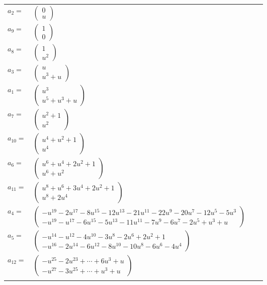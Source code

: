 \documentclass[1p]{elsarticle_modified}
\theoremstyle{definition}
\begin{document}
\begin{tabular}{m{7pt} m{180pt} m{7pt} m{180pt} }
\flushright $a_{2}=$&$\begin{pmatrix}0\\u\end{pmatrix}$ \\
\flushright $a_{9}=$&$\begin{pmatrix}1\\0\end{pmatrix}$ \\
\flushright $a_{8}=$&$\begin{pmatrix}1\\u^2\end{pmatrix}$ \\
\flushright $a_{3}=$&$\begin{pmatrix}u\\u^3+u\end{pmatrix}$ \\
\flushright $a_{1}=$&$\begin{pmatrix}u^3\\u^5+u^3+u\end{pmatrix}$ \\
\flushright $a_{7}=$&$\begin{pmatrix}u^2+1\\u^2\end{pmatrix}$ \\
\flushright $a_{10}=$&$\begin{pmatrix}u^4+u^2+1\\u^4\end{pmatrix}$ \\
\flushright $a_{6}=$&$\begin{pmatrix}u^6+u^4+2 u^2+1\\u^6+u^2\end{pmatrix}$ \\
\flushright $a_{11}=$&$\begin{pmatrix}u^8+u^6+3 u^4+2 u^2+1\\u^8+2 u^4\end{pmatrix}$ \\
\flushright $a_{4}=$&$\begin{pmatrix}- u^{19}-2 u^{17}-8 u^{15}-12 u^{13}-21 u^{11}-22 u^9-20 u^7-12 u^5-5 u^3\\- u^{19}- u^{17}-6 u^{15}-5 u^{13}-11 u^{11}-7 u^9-6 u^7-2 u^5+u^3+u\end{pmatrix}$ \\
\flushright $a_{5}=$&$\begin{pmatrix}- u^{14}- u^{12}-4 u^{10}-3 u^8-2 u^6+2 u^2+1\\- u^{16}-2 u^{14}-6 u^{12}-8 u^{10}-10 u^8-6 u^6-4 u^4\end{pmatrix}$ \\
\flushright $a_{12}=$&$\begin{pmatrix}- u^{25}-2 u^{23}+\cdots+6 u^3+u\\- u^{27}-3 u^{25}+\cdots+u^3+u\end{pmatrix}$\\&\end{tabular}
\end{document}
